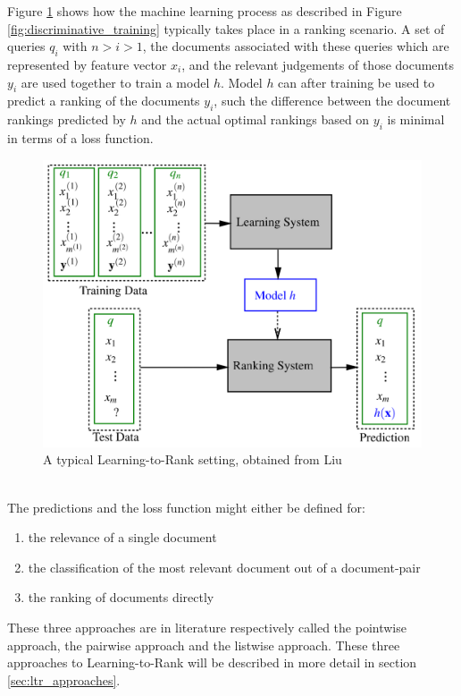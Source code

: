 Figure \ref{fig:ltr_framework} shows how the machine learning process as described in Figure \ref{fig:discriminative_training} typically takes place in a ranking scenario. A set of queries $q_i$ with $n > i > 1$, the documents associated with these queries which are represented by feature vector $x_i$, and the relevant judgements of those documents $y_i$ are used together to train a model $h$. Model $h$ can after training be used to predict a ranking of the documents $y_i$, such the difference between the document rankings predicted by $h$ and the actual optimal rankings based on $y_i$ is minimal in terms of a loss function.
\begin{figure}[!h]
\includegraphics[scale=0.25]{gfx/ltr_framework}
\caption{A typical Learning-to-Rank setting, obtained from Liu \cite{Liu2007}}
\label{fig:ltr_framework}
\end{figure}\\

The predictions and the loss function might either be defined for:
\begin{enumerate}
\item the relevance of a single document
\item the classification of the most relevant document out of a document-pair
\item the ranking of documents directly
\end{enumerate}
These three approaches are in literature respectively called the pointwise approach, the pairwise approach and the listwise approach. These three approaches to Learning-to-Rank will be described in more detail in section \ref{sec:ltr_approaches}.

